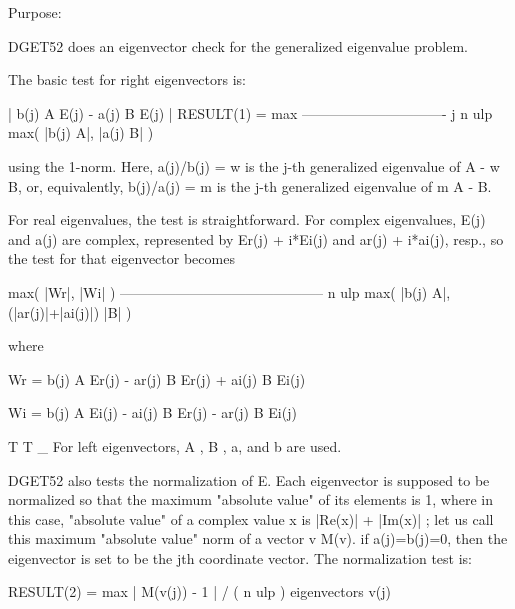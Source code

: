 \begin{DoxyParagraph}{Purpose\+: }
\begin{DoxyVerb} DGET52  does an eigenvector check for the generalized eigenvalue
 problem.

 The basic test for right eigenvectors is:

                           | b(j) A E(j) -  a(j) B E(j) |
         RESULT(1) = max   -------------------------------
                      j    n ulp max( |b(j) A|, |a(j) B| )

 using the 1-norm.  Here, a(j)/b(j) = w is the j-th generalized
 eigenvalue of A - w B, or, equivalently, b(j)/a(j) = m is the j-th
 generalized eigenvalue of m A - B.

 For real eigenvalues, the test is straightforward.  For complex
 eigenvalues, E(j) and a(j) are complex, represented by
 Er(j) + i*Ei(j) and ar(j) + i*ai(j), resp., so the test for that
 eigenvector becomes

                 max( |Wr|, |Wi| )
     --------------------------------------------
     n ulp max( |b(j) A|, (|ar(j)|+|ai(j)|) |B| )

 where

     Wr = b(j) A Er(j) - ar(j) B Er(j) + ai(j) B Ei(j)

     Wi = b(j) A Ei(j) - ai(j) B Er(j) - ar(j) B Ei(j)

                         T   T  _
 For left eigenvectors, A , B , a, and b  are used.

 DGET52 also tests the normalization of E.  Each eigenvector is
 supposed to be normalized so that the maximum "absolute value"
 of its elements is 1, where in this case, "absolute value"
 of a complex value x is  |Re(x)| + |Im(x)| ; let us call this
 maximum "absolute value" norm of a vector v  M(v).
 if a(j)=b(j)=0, then the eigenvector is set to be the jth coordinate
 vector.  The normalization test is:

         RESULT(2) =      max       | M(v(j)) - 1 | / ( n ulp )
                    eigenvectors v(j)\end{DoxyVerb}
 
\end{DoxyParagraph}

